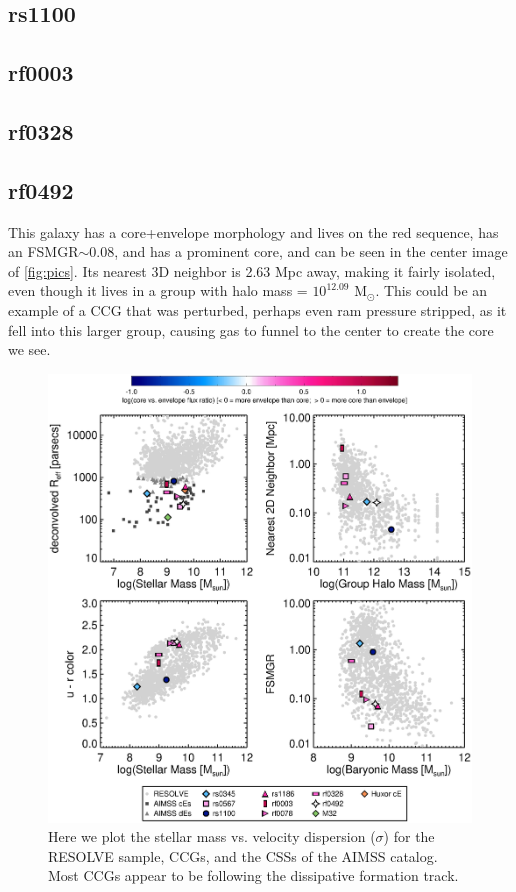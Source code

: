 \documentclass[iop,apj]{emulateapj}
\begin{document}
\subsection{rs1100}

\subsection{rf0003}

\subsection{rf0328}

\subsection{rf0492}
This galaxy has a core+envelope morphology and lives on the red sequence, has an FSMGR$\sim 0.08$, and has a prominent core, and can be seen in the center image of \autoref{fig:pics}. Its nearest 3D neighbor is 2.63 Mpc away, making it fairly isolated, even though it lives in a group with halo mass = $10^{12.09}$ M$_{\odot}$. This could be an example of a CCG that was perturbed, perhaps even ram pressure stripped, as it fell into this larger group, causing gas to funnel to the center to create the core we see. 

\begin{figure}[b]
\begin{center}
\includegraphics[scale=0.7]{miniplots.eps}
\caption{Here we plot the stellar mass vs. velocity dispersion ($\sigma$) for the RESOLVE sample, CCGs, and the CSSs of the AIMSS catalog. Most CCGs appear to be following the dissipative formation track.}
\label{fig:miniplots}
\end{center}
\end{figure}
\end{document}
